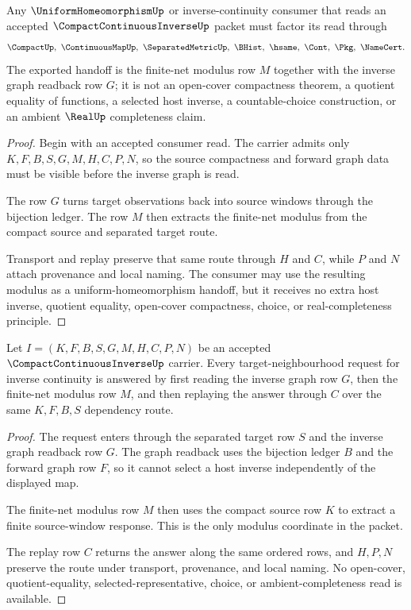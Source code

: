 \begin{theorem}
\label{thm:compact-continuous-inverse-uniform-handoff}
Any $\UniformHomeomorphismUp$ or inverse-continuity consumer that reads an accepted $\CompactContinuousInverseUp$ packet must factor its read through
$$
\CompactUp,\ \ContinuousMapUp,\ \SeparatedMetricUp,\ \BHist,\ \hsame,\ \Cont,\ \Pkg,\ \NameCert .
$$
The exported handoff is the finite-net modulus row $M$ together with the inverse graph readback row $G$; it is not an open-cover compactness theorem, a quotient equality of functions, a selected host inverse, a countable-choice construction, or an ambient $\RealUp$ completeness claim.
\end{theorem}
\begin{proof}
Begin with an accepted consumer read. The carrier admits only $K,F,B,S,G,M,H,C,P,N$, so the source compactness and forward graph data must be visible before the inverse graph is read.

The row $G$ turns target observations back into source windows through the bijection ledger. The row $M$ then extracts the finite-net modulus from the compact source and separated target route.

Transport and replay preserve that same route through $H$ and $C$, while $P$ and $N$ attach provenance and local naming. The consumer may use the resulting modulus as a uniform-homeomorphism handoff, but it receives no extra host inverse, quotient equality, open-cover compactness, choice, or real-completeness principle.
\end{proof}

\begin{theorem}
\label{thm:compact-continuous-inverse-finite-net-readback}
Let $I=(K,F,B,S,G,M,H,C,P,N)$ be an accepted $\CompactContinuousInverseUp$ carrier. Every target-neighbourhood request for inverse continuity is answered by first reading the inverse graph row $G$, then the finite-net modulus row $M$, and then replaying the answer through $C$ over the same $K,F,B,S$ dependency route.
\end{theorem}
\begin{proof}
The request enters through the separated target row $S$ and the inverse graph readback row $G$. The graph readback uses the bijection ledger $B$ and the forward graph row $F$, so it cannot select a host inverse independently of the displayed map.

The finite-net modulus row $M$ then uses the compact source row $K$ to extract a finite source-window response. This is the only modulus coordinate in the packet.

The replay row $C$ returns the answer along the same ordered rows, and $H,P,N$ preserve the route under transport, provenance, and local naming. No open-cover, quotient-equality, selected-representative, choice, or ambient-completeness read is available.
\end{proof}

